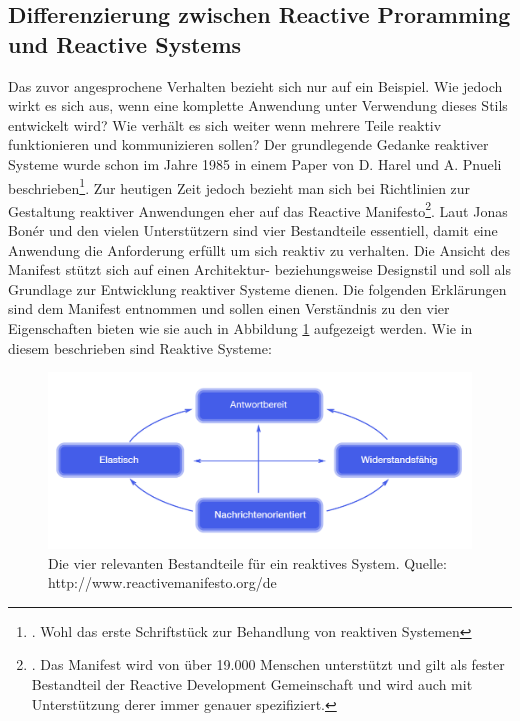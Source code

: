 \subsection{Differenzierung zwischen Reactive Proramming und Reactive Systems}
Das zuvor angesprochene Verhalten bezieht sich nur auf ein Beispiel. Wie jedoch wirkt es sich aus, wenn eine komplette Anwendung unter Verwendung dieses Stils entwickelt wird? Wie verhält es sich weiter wenn mehrere Teile reaktiv funktionieren und kommunizieren sollen? Der grundlegende Gedanke reaktiver Systeme wurde schon im Jahre 1985 in einem Paper von D. Harel und A. Pnueli beschrieben\footnote{\cite{Harel1985}. Wohl das erste Schriftstück zur Behandlung von reaktiven Systemen}. Zur heutigen Zeit jedoch bezieht man sich bei Richtlinien zur Gestaltung reaktiver Anwendungen eher auf das Reactive Manifesto\footnote{\cite{Boner.2014}. Das Manifest wird von über 19.000 Menschen unterstützt und gilt als fester Bestandteil der Reactive Development Gemeinschaft und wird auch mit Unterstützung derer immer genauer spezifiziert.}. Laut Jonas Bonér und den vielen Unterstützern sind vier Bestandteile essentiell, damit eine Anwendung die Anforderung erfüllt um sich reaktiv zu verhalten. Die Ansicht des Manifest stützt sich auf einen Architektur- beziehungsweise Designstil und soll als Grundlage zur Entwicklung reaktiver Systeme dienen. Die folgenden Erklärungen sind dem Manifest entnommen und sollen einen Verständnis zu den vier Eigenschaften bieten wie sie auch in Abbildung \ref{pic:manifest4} aufgezeigt werden. Wie in diesem beschrieben sind Reaktive Systeme:
\begin{figure}
	\centering
	\includegraphics[width=1\textwidth]{Abb/manifest4achsen.PNG}
	\caption{Die vier relevanten Bestandteile für ein reaktives System. Quelle: http://www.reactivemanifesto.org/de}
	\label{pic:manifest4}
\end{figure}
